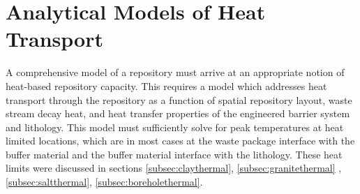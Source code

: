 











\section{Analytical Models of Heat Transport} \label{sec:analytical_heat}
 
A comprehensive model of a repository must arrive at an appropriate notion of 
heat-based repository capacity.  This requires a model which addresses heat 
transport through the repository as a function of spatial repository layout, 
waste stream decay heat, and heat transfer properties of the engineered barrier  
system and lithology. This model must sufficiently solve for peak temperatures 
at heat limited locations, which are in most cases at the waste package 
interface with the buffer material and the buffer material interface with the 
lithology. These heat limits were discussed in sections \ref{subsec:claythermal}, 
\ref{subsec:granitethermal} , \ref{subsec:saltthermal},   
\ref{subsec:boreholethermal}.

